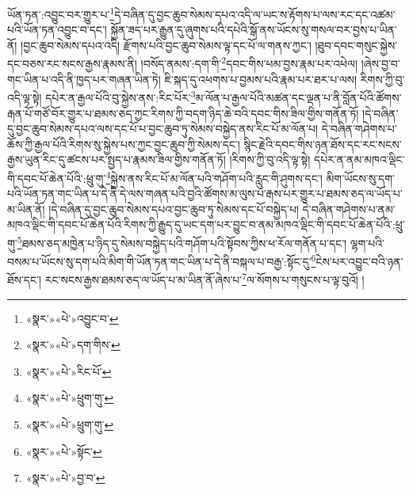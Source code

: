 ཡོན་ཏན་:འབྱུང་བར་གྱུར་པ་\footnote{«སྣར་»«པེ་»འབྱུང་བ་}དེ་བཞིན་དུ་བྱང་ཆུབ་སེམས་དཔའ་འདི་ལ་ཡང་ས་རྟོགས་པ་ལས་རང་དང་འཚམ་པའི་ཡོན་ཏན་འབྱུང་བ་དང་། སྐྱོན་ཟད་པར་རྒྱུན་དུ་ཞུགས་པའི་དཔེའི་སྒོ་ནས་ཡོངས་སུ་གསལ་བར་བྱས་པ་ཡིན་ནོ། །བྱང་ཆུབ་སེམས་དཔའ་འདི། རྫོགས་པའི་བྱང་ཆུབ་སེམས་ལྟ་དང་པོ་ལ་གནས་ཀྱང་། །ཐུབ་དབང་གསུང་སྐྱེས་དང་བཅས་རང་སངས་རྒྱས་རྣམས་ནི། །བསོད་ནམས་:དག་གི་\footnote{«སྣར་»«པེ་»དག་གིས་}དབང་གིས་ཕམ་བྱས་རྣམ་པར་འཕེལ། །ཞེས་བྱ་བ་གང་ཡིན་པ་འདི་ནི་ཁྱད་པར་གཞན་ཡིན་ཏེ། ཇི་སྐད་དུ་འཕགས་པ་བྱམས་པའི་རྣམ་པར་ཐར་པ་ལས། རིགས་ཀྱི་བུ་འདི་ལྟ་སྟེ། དཔེར་ན་རྒྱལ་པོའི་བུ་སྐྱེས་ནས་:རིང་པོར་\footnote{«སྣར་»«པེ་»རིང་པོ་}མ་ལོན་པ་རྒྱལ་པོའི་མཚན་དང་ལྡན་པ་ནི་བློན་པོའི་ཚོགས་རྒན་པོ་གཙོ་བོར་གྱུར་པ་ཐམས་ཅད་ཀྱང་རིགས་ཀྱི་བདག་ཉིད་ཆེ་བའི་དབང་གིས་ཟིལ་གྱིས་གནོན་ཏོ། །དེ་བཞིན་དུ་བྱང་ཆུབ་སེམས་དཔའ་ལས་དང་པོ་པ་བྱང་ཆུབ་ཏུ་སེམས་བསྐྱེད་ནས་རིང་པོ་མ་ལོན་པ། དེ་བཞིན་གཤེགས་པ་ཆོས་ཀྱི་རྒྱལ་པོའི་རིགས་སུ་སྐྱེས་པས་ཀྱང་བྱང་ཆུབ་ཀྱི་སེམས་དང་། སྙིང་རྗེའི་དབང་གིས་ཉན་ཐོས་དང་རང་སངས་རྒྱས་ཡུན་རིང་དུ་ཚངས་པར་སྤྱད་པ་རྣམས་ཟིལ་གྱིས་གནོན་ཏོ། །རིགས་ཀྱི་བུ་འདི་ལྟ་སྟེ། དཔེར་ན་ནམ་མཁའ་ལྡིང་གི་དབང་པོ་ཆེན་པོའི་:ཕྲུ་གུ་\footnote{«སྣར་»«པེ་»ཕྲུག་གུ་}སྐྱེས་ནས་རིང་པོ་མ་ལོན་པའི་གཤོག་པའི་རླུང་གི་ཤུགས་དང་། མིག་ཡོངས་སུ་དག་པའི་ཡོན་ཏན་གང་ཡིན་པ་དེ་ནི་དེ་ལས་གཞན་པའི་བྱའི་ཚོགས་མ་ལུས་པ་རྒས་པར་གྱུར་པ་ཐམས་ཅད་ལ་ཡོད་པ་མ་ཡིན་ནོ། །དེ་བཞིན་དུ་བྱང་ཆུབ་སེམས་དཔའ་བྱང་ཆུབ་ཏུ་སེམས་དང་པོ་བསྐྱེད་པ། དེ་བཞིན་གཤེགས་པ་ནམ་མཁའ་ལྡིང་གི་དབང་པོ་ཆེན་པོའི་རིགས་ཀྱི་རྒྱུད་དུ་ཡང་དག་པར་བྱུང་བ་ནམ་མཁའ་ལྡིང་གི་དབང་པོ་ཆེན་པོའི་:ཕྲུ་གུ་\footnote{«སྣར་»«པེ་»ཕྲུག་གུ་}ཐམས་ཅད་མཁྱེན་པ་ཉིད་དུ་སེམས་བསྐྱེད་པའི་གཤོག་པའི་སྟོབས་ཀྱིས་ཕ་རོལ་གནོན་པ་དང་། ལྷག་པའི་བསམ་པ་ཡོངས་སུ་དག་པའི་མིག་གི་ཡོན་ཏན་གང་ཡིན་པ་དེ་ནི་བསྐལ་པ་བརྒྱ་:སྟོང་དུ་\footnote{«སྣར་»«པེ་»སྟོང་}ངེས་པར་འབྱུང་བའི་ཉན་ཐོས་དང་། རང་སངས་རྒྱས་ཐམས་ཅད་ལ་ཡོད་པ་མ་ཡིན་ནོ་ཞེས་པ་\footnote{«སྣར་»«པེ་»བྱ་བ་}ལ་སོགས་པ་གསུངས་པ་ལྟ་བུའོ། །
